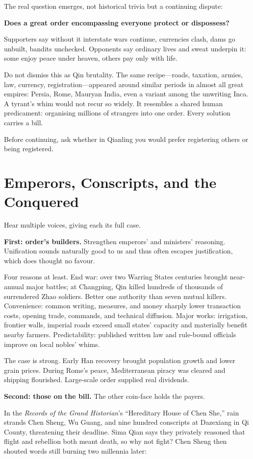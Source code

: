 The real question emerges, not historical trivia but a continuing dispute:

\textbf{Does a great order encompassing everyone protect or dispossess?}

Supporters say without it interstate wars continue, currencies clash, dams go unbuilt, bandits unchecked. Opponents say ordinary lives and sweat underpin it: some enjoy peace under heaven, others pay only with life.

Do not dismiss this as Qin brutality. The same recipe---roads, taxation, armies, law, currency, registration---appeared around similar periods in almost all great empires: Persia, Rome, Mauryan India, even a variant among the unwriting Inca. A tyrant's whim would not recur so widely. It resembles a shared human predicament: organising millions of strangers into one order. Every solution carries a bill.

Before continuing, ask whether in Qianling you would prefer registering others or being registered.

\section{Emperors, Conscripts, and the Conquered}
Hear multiple voices, giving each its full case.

\textbf{First: order's builders.} Strengthen emperors' and ministers' reasoning. Unification sounds naturally good to us and thus often escapes justification, which does thought no favour.

Four reasons at least. End war: over two Warring States centuries brought near-annual major battles; at Changping, Qin killed hundreds of thousands of surrendered Zhao soldiers. Better one authority than seven mutual killers. Convenience: common writing, measures, and money sharply lower transaction costs, opening trade, commands, and technical diffusion. Major works: irrigation, frontier walls, imperial roads exceed small states' capacity and materially benefit nearby farmers. Predictability: published written law and rule-bound officials improve on local nobles' whims.

The case is strong. Early Han recovery brought population growth and lower grain prices. During Rome's peace, Mediterranean piracy was cleared and shipping flourished. Large-scale order supplied real dividends.

\textbf{Second: those on the bill.} The other coin-face holds the payers.

In the \textit{Records of the Grand Historian}'s ``Hereditary House of Chen She,'' rain strands Chen Sheng, Wu Guang, and nine hundred conscripts at Dazexiang in Qi County, threatening their deadline. Sima Qian says they privately reasoned that flight and rebellion both meant death, so why not fight? Chen Sheng then shouted words still burning two millennia later:

